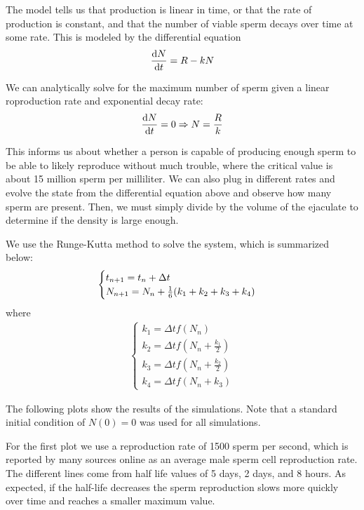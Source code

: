\documentclass[12pt]{article}
\begin{document}
The model tells us that production is linear in time, or that the rate of production is constant, and that the number of viable sperm decays over time at some rate. This is modeled by the differential equation
\begin{eqnarray*}
    \dv{N}{t} = R - kN
\end{eqnarray*}

We can analytically solve for the maximum number of sperm given a linear roproduction rate and exponential decay rate:
\begin{align*}
\dv{N}{t} = 0 \Rightarrow N = \frac{R}{k}
\end{align*}

This informs us about whether a person is capable of producing enough sperm to be able to likely reproduce without much trouble, where the critical value is about 15 million sperm per milliliter. We can also plug in different rates and evolve the state from the differential equation above and observe how many sperm are present. Then, we must simply divide by the volume of the ejaculate to determine if the density is large enough.

We use the Runge-Kutta method to solve the system, which is summarized below:
\begin{align*}
\begin{cases}
t_{n+1} = t_n + \Delta t \\
N_{n+1} = N_n + \frac{1}{6}\qty(k_1 + k_2 + k_3 + k_4)
\end{cases}
\end{align*}
where
\begin{align*}
\begin{cases}
k_1 = \Delta t f(N_n) \\
k_2 = \Delta t f(N_n + \frac{k_1}{2}) \\
k_3 = \Delta t f(N_n + \frac{k_2}{2}) \\
k_4 = \Delta t f(N_n + k_3)
\end{cases}
\end{align*}

The following plots show the results of the simulations. Note that a standard initial condition of $N(0) = 0$ was used for all simulations.

For the first plot we use a reproduction rate of 1500 sperm per second, which is reported by many sources online as an average male sperm cell reproduction rate. The different lines come from half life values of 5 days, 2 days, and 8 hours. As expected, if the half-life decreases the sperm reproduction slows more quickly over time and reaches a smaller maximum value.
\end{document}
